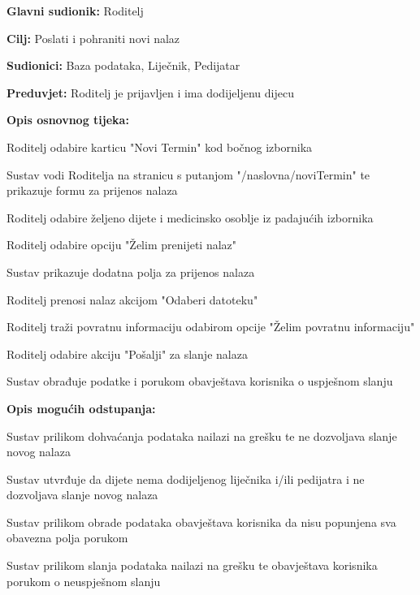 					
					
					\noindent {}
					\begin{packed_item}
						
						\item \textbf{Glavni sudionik: }Roditelj
						\item  \textbf{Cilj:} Poslati i pohraniti novi nalaz
						\item  \textbf{Sudionici:} Baza podataka, Liječnik, Pedijatar
						\item  \textbf{Preduvjet:} Roditelj je prijavljen i ima dodijeljenu dijecu
						\item  \textbf{Opis osnovnog tijeka:}
						
						\item[] \begin{packed_enum}
							\item Roditelj odabire karticu "Novi Termin" kod bočnog izbornika
							\item Sustav vodi Roditelja na stranicu s putanjom "/naslovna/noviTermin" te prikazuje formu za prijenos nalaza
							\item Roditelj odabire željeno dijete i medicinsko osoblje iz padajućih izbornika
							\item Roditelj odabire opciju "Želim prenijeti nalaz"
							\item Sustav prikazuje dodatna polja za prijenos nalaza
							\item Roditelj prenosi nalaz akcijom "Odaberi datoteku"
							\item Roditelj traži povratnu informaciju odabirom opcije "Želim povratnu informaciju"
							\item Roditelj odabire akciju "Pošalji" za slanje nalaza
							\item Sustav obrađuje podatke i porukom obavještava korisnika o uspješnom slanju
						\end{packed_enum}
						
						\item  \textbf{Opis mogućih odstupanja:}
						
						\item[] \begin{packed_item}
							\item[3.a] Sustav prilikom dohvaćanja podataka nailazi na grešku te ne dozvoljava slanje novog nalaza
							
							\item[3.b] Sustav utvrđuje da dijete nema dodijeljenog liječnika i/ili pedijatra i ne dozvoljava slanje novog nalaza	
							
							\item[9.a] Sustav prilikom obrade podataka obavještava korisnika da nisu popunjena sva obavezna polja porukom
							
							\item[9.b] Sustav prilikom slanja podataka nailazi na grešku te obavještava korisnika porukom o neuspješnom slanju
						\end{packed_item}
					\end{packed_item}
					
